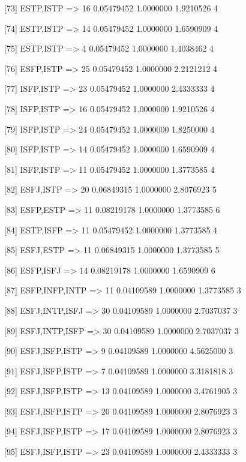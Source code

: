 [73]  {ESTP,ISTP}           => {16} 0.05479452 1.0000000  1.9210526  4   

[74]  {ESTP,ISTP}           => {14} 0.05479452 1.0000000  1.6590909  4   

[75]  {ESTP,ISTP}           => {4}  0.05479452 1.0000000  1.4038462  4   

[76]  {ESFP,ISTP}           => {25} 0.05479452 1.0000000  2.2121212  4   

[77]  {ISFP,ISTP}           => {23} 0.05479452 1.0000000  2.4333333  4   

[78]  {ISFP,ISTP}           => {16} 0.05479452 1.0000000  1.9210526  4   

[79]  {ISFP,ISTP}           => {24} 0.05479452 1.0000000  1.8250000  4   

[80]  {ISFP,ISTP}           => {14} 0.05479452 1.0000000  1.6590909  4   

[81]  {ISFP,ISTP}           => {11} 0.05479452 1.0000000  1.3773585  4   

[82]  {ESFJ,ISTP}           => {20} 0.06849315 1.0000000  2.8076923  5   

[83]  {ESFP,ESTP}           => {11} 0.08219178 1.0000000  1.3773585  6   

[84]  {ESTP,ISFP}           => {11} 0.05479452 1.0000000  1.3773585  4   

[85]  {ESFJ,ESTP}           => {11} 0.06849315 1.0000000  1.3773585  5   

[86]  {ESFP,ISFJ}           => {14} 0.08219178 1.0000000  1.6590909  6   

[87]  {ESFP,INFP,INTP}      => {11} 0.04109589 1.0000000  1.3773585  3   

[88]  {ESFJ,INTP,ISFJ}      => {30} 0.04109589 1.0000000  2.7037037  3   

[89]  {ESFJ,INTP,ISFP}      => {30} 0.04109589 1.0000000  2.7037037  3   

[90]  {ESFJ,ISFP,ISTP}      => {9}  0.04109589 1.0000000  4.5625000  3   

[91]  {ESFJ,ISFP,ISTP}      => {7}  0.04109589 1.0000000  3.3181818  3   

[92]  {ESFJ,ISFP,ISTP}      => {13} 0.04109589 1.0000000  3.4761905  3   

[93]  {ESFJ,ISFP,ISTP}      => {20} 0.04109589 1.0000000  2.8076923  3   

[94]  {ESFJ,ISFP,ISTP}      => {17} 0.04109589 1.0000000  2.8076923  3   

[95]  {ESFJ,ISFP,ISTP}      => {23} 0.04109589 1.0000000  2.4333333  3   

